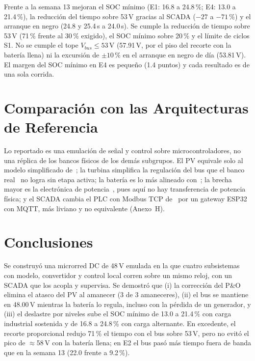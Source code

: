 \documentclass[conference]{IEEEtran}
\begin{document}
Frente a la semana 13 mejoran el SOC mínimo (E1: 16.8 a 24.8\,\%; E4: 13.0 a 21.4\,\%), la reducción del tiempo sobre 53\,V gracias al SCADA ($-27$ a $-71\,\%$) y el arranque en negro (24.8 y 25.4\,s a 24.0\,s). Se cumple la reducción de tiempo sobre 53\,V (71\,\% frente al 30\,\% exigido), el SOC mínimo sobre 20\,\% y el límite de ciclos S1. No se cumple el tope $V_{bus}\le53$\,V (57.91\,V, por el piso del recorte con la batería llena) ni la excursión de $\pm10\,\%$ en el arranque en negro de día (53.81\,V). El margen del SOC mínimo en E4 es pequeño (1.4 puntos) y cada resultado es de una sola corrida.



\section{Comparación con las Arquitecturas de Referencia}

Lo reportado es una emulación de señal y control sobre microcontroladores, no una réplica de los bancos físicos de los demás subgrupos. El PV equivale solo al modelo simplificado de~\cite{aristizabal2026pv}; la turbina simplifica la regulación del bus que el banco real~\cite{gonzalez2026eolica} no logra sin etapa activa; la batería es lo más alineado con~\cite{vega2026bateria}; la brecha mayor es la electrónica de potencia~\cite{pinto2026peb}, pues aquí no hay transferencia de potencia física; y el SCADA cambia el PLC con Modbus TCP de~\cite{alvarez2026scada} por un gateway ESP32 con MQTT, más liviano y no equivalente (Anexo~H).

\section{Conclusiones}

Se construyó una microrred DC de 48\,V emulada en la que cuatro subsistemas con modelo, convertidor y control local corren sobre un mismo reloj, con un SCADA que los acopla y supervisa. Se demostró que (i) la corrección del P\&O elimina el atasco del PV al amanecer (3 de 3 amaneceres), (ii) el bus se mantiene en 48.00\,V mientras la batería lo regula, incluso con la pérdida de un generador, y (iii) el deslastre por niveles sube el SOC mínimo de 13.0 a 21.4\,\% con carga industrial sostenida y de 16.8 a 24.8\,\% con carga alternante. En excedente, el recorte proporcional redujo 71\,\% el tiempo con el bus sobre 53\,V, pero no evitó el pico de $\approx$58\,V con la batería llena; en E2 el bus pasó más tiempo fuera de banda que en la semana 13 (22.0 frente a 9.2\,\%).
\end{document}
